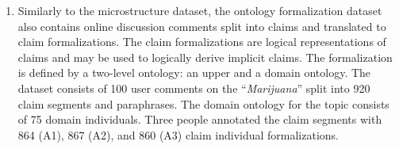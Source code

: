 \begin{enumerate}[label=\textbf{A.\arabic*}]
\item\label{item:structure_dataset} 
Similarly to the microstructure dataset, 
the ontology formalization dataset also contains online discussion
comments split into claims and translated to claim formalizations.
The claim formalizations are logical representations of claims
and may be used to logically derive implicit claims.
The formalization is defined by a two-level ontology: an upper and 
a domain ontology. 
The dataset consists of 100 user comments on the ``\emph{Marijuana}''
split into 920 claim segments and paraphrases. 
The domain ontology for the topic consists of 75 domain
individuals. Three people annotated the claim segments with 
864 (A1), 867 (A2), and 860 (A3) claim individual formalizations.

\end{enumerate}
